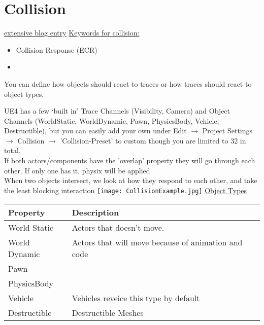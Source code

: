 \documentclass{scrbook}
\begin{document}
                


    

    

   
    \chapter{Collision}
        \href{https://www.unrealengine.com/en-US/blog/collision-filtering}{extensive blog entry}
        \uline{Keywords for collision:}
        \begin{itemize}
            \item \glsdesc{Collision Response (ECR)}
            \item 
        \end{itemize}

        You can define how objects should react to traces or how
        traces should react to object types.

        UE4 has a few ‘built in’ Trace Channels
        (Visibility, Camera) and Object Channels (WorldStatic, WorldDynamic, Pawn, PhysicsBody, Vehicle, Destructible),
        but you can easily add your own under Edit $\rightarrow$ Project Settings $\rightarrow$ Collision $\rightarrow$ 'Collision-Preset' to custom
        though you are limited to 32 in total. \\
        If both actors/components have the 'overlap' property they will go through each other.
        If only one has it, physix will be applied \\

        When two objects intersect, we look at how they respond to each other, and take the least blocking interaction
         \texttt{[image: CollisionExample.jpg]}
        \underline{Object Types}
        \begin{table}[H]
            \begin{tabular}{|l|l|}
                \hline
                    Property & Description \\
                \hline
                    World Static & Actors that doesn't move. \\
                    World Dynamic & Actors that will move because of animation and code \\
                    Pawn & \\
                    PhysicsBody & \\
                    Vehicle & Vehicles reveice this type by default \\
                    Destructible & Destructible Meshes \\
                \hline
            \end{tabular}
        \end{table}
        
\end{document}
